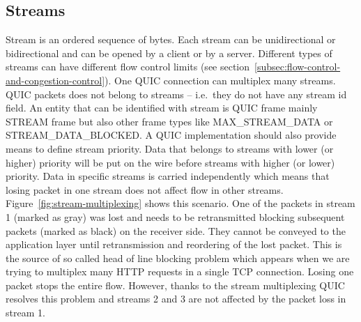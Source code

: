 \subsection{Streams}
\label{subsec:streams}
Stream is an ordered sequence of bytes.
Each stream can be unidirectional or bidirectional and can be opened by a client or by a server.
Different types of streams can have different flow control limits (see section~\ref{subsec:flow-control-and-congestion-control}).
One QUIC connection can multiplex many streams.
QUIC packets does not belong to streams -- i.e.\ they do not have any stream id field.
An entity that can be identified with stream is QUIC frame mainly STREAM frame but also other frame types like MAX\_STREAM\_DATA or STREAM\_DATA\_BLOCKED\@.
A QUIC implementation should also provide means to define stream priority.
Data that belongs to streams with lower (or higher) priority will be put on the wire before streams with higher (or lower)
priority.
Data in specific streams is carried independently which means that losing packet in one stream does not affect flow in other streams.
Figure~\ref{fig:stream-multiplexing} shows this scenario.
One of the packets in stream 1 (marked as gray) was lost and needs to be retransmitted blocking subsequent packets (marked as black) on the receiver side.
They cannot be conveyed to the application layer until retransmission and reordering of the lost packet.
This is the source of so called head of line blocking problem which appears when we are trying to multiplex many HTTP requests in a single TCP connection.
Losing one packet stops the entire flow.
However, thanks to the stream multiplexing QUIC resolves this problem and streams 2 and 3 are not affected by the packet loss in stream 1.

